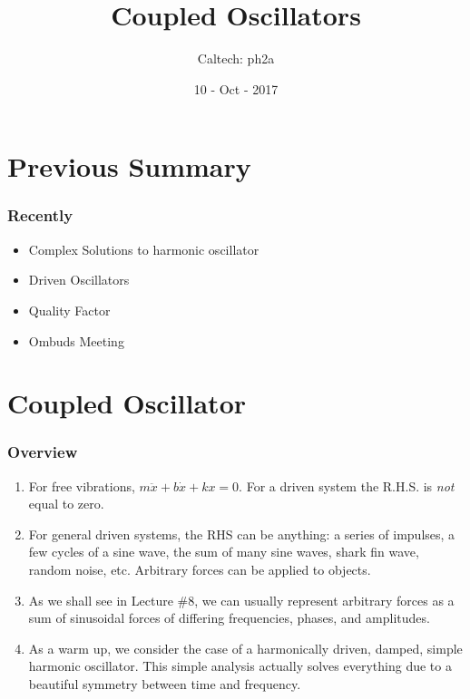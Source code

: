 \documentclass[pdf,hideothersubsections]{beamer}
\begin{document}
\title{Coupled Oscillators}  
\author{Caltech: ph2a}
\date{10 - Oct - 2017}

\frame{\titlepage} 



\section{Previous Summary}
\begin{frame}
\frametitle{Recently}
\begin{itemize}
\item Complex Solutions to harmonic oscillator
\item Driven Oscillators
\item Quality Factor
\item Ombuds Meeting
\end{itemize}
\end{frame}




\section{Coupled Oscillator}
\begin{frame}
\frametitle{Overview}
\pause
\begin{enumerate}
\item For free vibrations, $m \ddot{x} + b \dot{x} + k x = 0$. For a
  driven system the R.H.S. is \emph{not} equal to zero.
\pause
\item For general driven systems, the RHS can be anything: a series of impulses, a few
  cycles of a sine wave, the sum of many sine waves, shark fin wave,
  random noise, etc. Arbitrary forces can be applied to objects.
\pause
\item As we shall see in Lecture \#8, we can usually represent
  arbitrary forces as a sum of sinusoidal forces of differing
  frequencies, phases, and amplitudes.
\pause
\item As a warm up, we consider the case of a harmonically driven,
  damped, simple harmonic oscillator. This simple analysis actually
  solves everything due to a beautiful symmetry between time and frequency.
\end{enumerate}
\end{frame}
\end{document}
